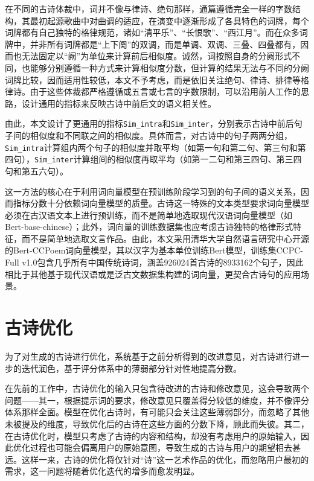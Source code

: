 在不同的古诗体裁中，词并不像与律诗、绝句那样，通篇遵循完全一样的字数结构，其最初起源歌曲中对曲调的适应，在演变中逐渐形成了各具特色的词牌，每个词牌都有自己独特的格律规范，诸如“清平乐”、“长恨歌”、“西江月”。而在众多词牌中，并非所有词牌都是“上下阕”的双调，而是单调、双调、三叠、四叠都有，因而也无法固定以“阙”为单位来计算前后相似度。诚然，词按照自身的分阙形式不同，也能够分别遵循一种方式来计算相似度分数，但计算的结果无法与不同的分阙词牌比较，因而适用性较低，本文不予考虑，而是依旧关注绝句、律诗、排律等格律诗。由于这些体裁都严格遵循或五言或七言的字数限制，可以沿用前人工作的思路，设计通用的指标来反映古诗中前后文的语义相关性。

由此，本文设计了更通用的指标\verb|Sim_intra|和\verb|Sim_inter|，分别表示古诗中前后句子间的相似度和不同联之间的相似度。具体而言，对古诗中的句子两两分组，\verb|Sim_intra|计算组内两个句子的相似度并取平均（如第一句和第二句、第三句和第四句），\verb|Sim_inter|计算组间的相似度再取平均（如第一二句和第三四句、第三四句和第五六句）。

这一方法的核心在于利用词向量模型在预训练阶段学习到的句子间的语义关系，因而指标分数十分依赖词向量模型的质量。古诗这一特殊的文本类型要求词向量模型必须在古汉语文本上进行预训练，而不是简单地选取现代汉语词向量模型（如Bert-base-chinese）；此外，词向量的训练数据集也应考虑古诗独特的格律形式特征，而不是简单地选取文言作品。由此，本文采用清华大学自然语言研究中心开源的Bert-CCPoem词向量模型，其以汉字为基本单位训练Bert模型，训练集CCPC-Full v1.0包含几乎所有中国传统诗词，涵盖926024首古诗的8933162个句子，因此相比于其他基于现代汉语或是泛古文数据集构建的词向量，更契合古诗句的应用场景。


\section{古诗优化}

为了对生成的古诗进行优化，系统基于之前分析得到的改进意见，对古诗进行进一步的迭代润色，基于评分体系中的薄弱部分针对性地提高分数。

在先前的工作中，古诗优化的输入只包含待改进的古诗和修改意见，这会导致两个问题——其一，根据提示词的要求，修改意见只覆盖得分较低的维度，并不像评分体系那样全面。模型在优化古诗时，有可能只会关注这些薄弱部分，而忽略了其他未被提及的维度，导致优化后的古诗在这些方面的分数下降，顾此而失彼。其二，在古诗优化时，模型只考虑了古诗的内容和结构，却没有考虑用户的原始输入，因此优化过程也可能会偏离用户的原始意图，导致生成的古诗与用户的期望相去甚远。这样一来，古诗的优化将仅针对“诗”这一艺术作品的优化，而忽略用户最初的需求，这一问题将随着优化迭代的增多而愈发明显。


